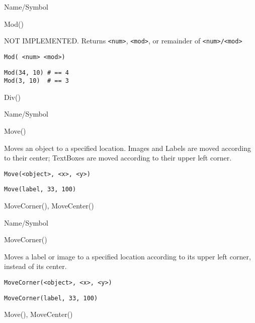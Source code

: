 \rl


\begin{desc}{Name/Symbol}
\item[Name/Symbol]	Mod()

\item[Description]	NOT IMPLEMENTED. Returns \verb+<num>+, \verb+<mod>+, or remainder of \verb+<num>/<mod>+

\item[Usage]		
\begin{verbatim}
Mod( <num> <mod>)
\end{verbatim}

\item[Example]	
\begin{verbatim}
Mod(34, 10)	# == 4
Mod(3, 10)	# == 3
\end{verbatim}

\item[See Also]	Div()
\end{desc}

\rl


\begin{desc}{Name/Symbol}
\item[Name/Symbol]	Move()

\item[Description]	Moves an object to a specified location.  
		Images and Labels are moved according to their center; 
		TextBoxes are moved according to their upper left corner.

\item[Usage]
\begin{verbatim}
Move(<object>, <x>, <y>)
\end{verbatim}

\item[Example]	
\begin{verbatim}
Move(label, 33, 100)
\end{verbatim}

\item[See Also]	MoveCorner(), MoveCenter()
\end{desc}

\rl


\begin{desc}{Name/Symbol}
\item[Name/Symbol]	MoveCorner()

\item[Description]	Moves a label or image to a specified location
		according to its upper left corner, instead of its center. 

\item[Usage]
\begin{verbatim}
MoveCorner(<object>, <x>, <y>)
\end{verbatim}

\item[Example]	
\begin{verbatim}
MoveCorner(label, 33, 100)
\end{verbatim}

\item[See Also]	Move(), MoveCenter()
\end{desc}

